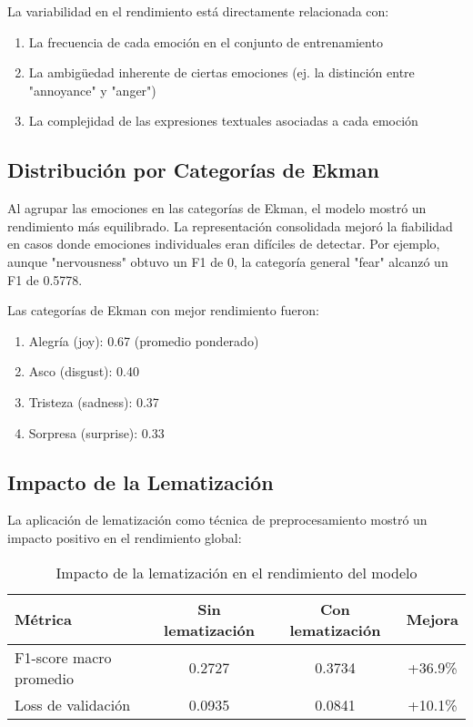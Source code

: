 \documentclass[12pt,a4paper]{report}
\begin{document}
La variabilidad en el rendimiento está directamente relacionada con:
\begin{enumerate}
  \item La frecuencia de cada emoción en el conjunto de entrenamiento
  \item La ambigüedad inherente de ciertas emociones (ej. la distinción entre "annoyance" y "anger")
  \item La complejidad de las expresiones textuales asociadas a cada emoción
\end{enumerate}

\subsection{Distribución por Categorías de Ekman}

Al agrupar las emociones en las categorías de Ekman, el modelo mostró un rendimiento más equilibrado. La representación consolidada mejoró la fiabilidad en casos donde emociones individuales eran difíciles de detectar. Por ejemplo, aunque "nervousness" obtuvo un F1 de 0, la categoría general "fear" alcanzó un F1 de 0.5778.

Las categorías de Ekman con mejor rendimiento fueron:
\begin{enumerate}
  \item Alegría (joy): 0.67 (promedio ponderado)
  \item Asco (disgust): 0.40
  \item Tristeza (sadness): 0.37
  \item Sorpresa (surprise): 0.33
\end{enumerate}

\subsection{Impacto de la Lematización}

La aplicación de lematización como técnica de preprocesamiento mostró un impacto positivo en el rendimiento global:

\begin{table}[htbp]
  \centering
  \caption{Impacto de la lematización en el rendimiento del modelo}
  \begin{tabular}{lccc}
    \toprule
    \textbf{Métrica} & \textbf{Sin lematización} & \textbf{Con lematización} & \textbf{Mejora} \\
    \midrule
    F1-score macro promedio & 0.2727 & 0.3734 & +36.9\% \\
    Loss de validación & 0.0935 & 0.0841 & +10.1\% \\
    \bottomrule
  \end{tabular}
\end{table}
\end{document}
